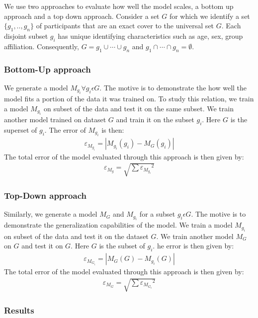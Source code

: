 {We use two approaches to evaluate how well the model scales, a bottom up approach and a top down approach. Consider a set $G$ for which we identify a set $\{g_1,..,g_n\}$ of participants that are an exact cover to the universal set $G$. Each disjoint subset $g_i$ has unique identifying characteristics such as age, sex, group affiliation. Consequently, $G=g_1\cup \cdots \cup g_n$ and $g_1\cap \cdots \cap g_n = \emptyset $. 

\subsubsection{Bottom-Up approach}\label{sec:bottomup}


We generate a model $M_{g_i} \forall g_i \epsilon G$. The motive is to demonstrate the how well the model fits a portion of the data it was trained on. To study this relation, we train a model $M_{g_i}$ on subset of the data and test it on the same subset. We train another model trained on dataset $G$ and train it on the subset $g_i$. Here $G$ is the superset of $g_i$. The error of $M_{g_i}$ is then:
\begin{eqnarray}
\varepsilon_{M_{g_i}}=|M_{g_i}(g_i)-M_{G}(g_i)|
\end{eqnarray}
The total error of the model evaluated through this approach is then given by:
\begin{eqnarray}
\varepsilon_{M_g} = \sqrt{\sum{\varepsilon_{M_{g_i}}}^2}
\end{eqnarray}


\subsubsection{Top-Down approach}\label{sec:topdown}
Similarly, we generate a model $M_{G}$ and $M_{g_i}$ for a subset $g_i\epsilon G$. The motive is to demonstrate the generalization capabilities of the model. We train a model $M_{g_i}$ on subset of the data and test it on the dataset $G$. We train another model $M_{G}$ on $G$ and test it on $G$. Here $G$ is the subset of $g_i$. he error is then given by:
\begin{eqnarray}
\varepsilon_{M_{G_i}}=|M_{G}(G)-M_{g_i}(G)|
\end{eqnarray}
The total error of the model evaluated through this approach is then given by:
\begin{eqnarray}
\varepsilon_{M_G} = \sqrt{\sum{\varepsilon_{M_{G_i}}}^2}
\end{eqnarray}

\subsubsection{Results}

}
